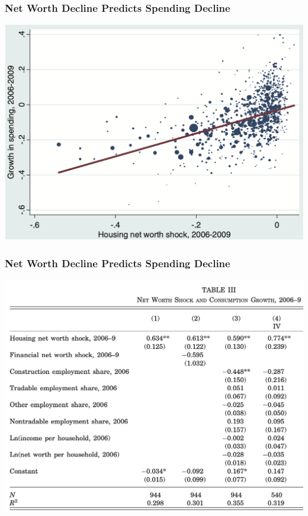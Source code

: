 \documentclass[english,xcolor=svgnames]{beamer}
\begin{document}
\begin{frame}
\frametitle[alignment=center]{Net Worth Decline Predicts Spending Decline}
\centering
\includegraphics[scale=0.4]{figures/MRSFIG3.png}
\end{frame}

\begin{frame}
\frametitle[alignment=center]{Net Worth Decline Predicts Spending Decline}
\centering
\includegraphics[scale=0.5]{figures/MRSTAB3.png}
\end{frame}
\end{document}
